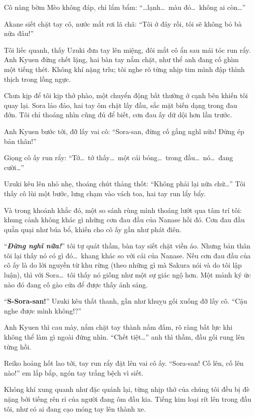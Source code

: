\documentclass[../main.tex]{subfiles}
\begin{document}
Cô nàng bờm Mèo không đáp, chỉ lẩm bẩm: ``\dots lạnh\dots\ màu đỏ\dots\ không ai còn\dots''

Akane siết chặt tay cô, nước mắt rơi lã chã: ``Tôi ở đây rồi, tôi sẽ không bỏ bà nữa đâu!''

Tôi liếc quanh, thấy Uzuki đưa tay lên miệng, đôi mắt cô ẩn sau mái tóc run rẩy. Anh Kyuen đứng chết lặng, hai bàn tay nắm chặt, như thể anh đang cố ghìm một tiếng thét. Không khí nặng trĩu; tôi nghe rõ từng nhịp tim mình đập thình thịch trong lồng ngực.

Chưa kịp để tôi kịp thở phào, một chuyển động bất thường ở cạnh bên khiến tôi quay lại. Sora lảo đảo, hai tay ôm chặt lấy đầu, sắc mặt biến dạng trong đau đớn. Tôi chỉ thoáng nhìn cũng đủ để biết, cơn đau ấy dữ dội hơn lần trước.

Anh Kyuen bước tới, đỡ lấy vai cô: ``Sora-san, đừng cố gắng nghĩ nữa! Đừng ép bản thân!''

Giọng cô ấy run rẩy: ``Tớ\dots\ tớ thấy\dots\ một cái bóng\dots\ trong đầu\dots\ nó\dots\ đang cười\dots''

Uzuki kêu lên nhỏ nhẹ, thoáng chút thảng thốt: ``Không phải lại nữa chứ\dots'' Tôi thấy cô lùi một bước, lưng chạm vào vách toa, hai tay run lẩy bẩy.

Và trong khoảnh khắc đó, một so sánh rùng mình thoáng lướt qua tâm trí tôi: khung cảnh không khác gì những cơn đau đầu của Nanase hồi đó. Cơn đau đầu quằn quại như búa bổ, khiến cho cô ấy gần như phát điên.

``\textit{\textbf{Đừng nghĩ nữa!}}'' tôi tự quát thầm, bàn tay siết chặt viền áo. Nhưng bản thân tôi lại thấy nó có gì đó\dots\ khang khác so với cái của Nanase. Nếu cơn đau đầu của cô ấy là do lời nguyền từ khu rừng (theo những gì mà Sakura nói và do tôi lập luận), thì với Sora\dots\ tôi thấy nó giống như một sự giác ngộ hơn. Một mảnh ký ức nào đó đang cố gào cửa để được thấy ánh sáng.

``\textbf{S-Sora-san!}'' Uzuki kêu thất thanh, gần như khuỵu gối xuống đỡ lấy cô. ``Cậu nghe được mình không!?''

Anh Kyuen thì cau mày, nắm chặt tay thành nấm đấm, rõ ràng bất lực khi không thể làm gì ngoài đứng nhìn. ``Chết tiệt\dots'' anh thì thầm, đầu gối rung lên từng hồi.

Reiko hoảng hốt lao tới, tay run rẩy đặt lên vai cô ấy. ``Sora-san! Cố lên, cố lên nào!'' em lắp bắp, ngón tay trắng bệch vì siết.

Không khí xung quanh như đặc quánh lại, từng nhịp thở của chúng tôi đều bị đè nặng bởi tiếng rên rỉ của người đang ôm đầu kia. Tiếng kim loại rít lên trong đầu tôi, như có ai đang cạo móng tay lên thành xe.
\end{document}
